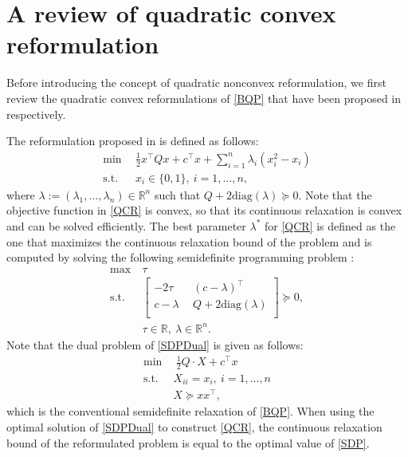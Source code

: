 \documentclass[pdflatex,sn-mathphys-num]{sn-jnl}%
\theoremstyle{thmstyleone}%
\theoremstyle{thmstyletwo}%
\theoremstyle{thmstylethree}%
\begin{document}
\section{A review of quadratic convex reformulation}\label{sec2}

Before introducing the concept of quadratic nonconvex reformulation, we first review the quadratic convex reformulations of \eqref{BQP} that have been proposed in \cite{Billionnet2007,Billionnet2012,Billionnet2013} respectively. %

The reformulation proposed in \cite{Billionnet2007} is defined as follows:
\begin{equation}\label{QCR}\tag{QCR}
	\begin{aligned}
		\min ~&~ \frac{1}{2}x^\top Q x+ c^\top x+\sum_{i=1}^n\lambda_i (x_i^2-x_i) \\
		\text{s.t.} ~&~ x_i \in \{0,1\},~i=1,\ldots,n,
	\end{aligned}
\end{equation}
where $\lambda:=(\lambda_1,\ldots,\lambda_n)\in\mathbb{R}^n$ such that $Q+2\textrm{diag}(\lambda)\succeq 0$. Note that the objective function in \eqref{QCR} is convex, so that its continuous relaxation is convex and can be solved efficiently. The best parameter $\lambda^\ast$ for \eqref{QCR} is defined as the one that maximizes the continuous relaxation bound of the problem and is computed by solving the following semidefinite programming problem  \cite{Billionnet2007}:
\begin{equation}\label{SDPDual}
	\begin{aligned}
		\max ~&\tau\\
		\mbox{s.t.} ~&\begin{bmatrix}
			-2 \tau ~&~ (c -\lambda)^\top \\
			c -\lambda  ~&~ Q+2\textrm{diag}(\lambda)  \\
		\end{bmatrix}\succeq 0,\\
		~&\tau\in\mathbb{R},~ \lambda\in\mathbb{R}^n.
	\end{aligned}
\end{equation}
Note that the dual problem of \eqref{SDPDual} is given as follows:
\begin{equation}\label{SDP}\tag{SDP}
	\begin{aligned}
		\min ~&~ \frac{1}{2}Q\cdot X+c^\top x\\
		\mbox{s.t.} ~&X_{ii}=x_i,~i=1,\ldots,n\\
		&X\succeq xx^\top,
	\end{aligned}
\end{equation}
which is the conventional semidefinite relaxation of \eqref{BQP}. When using the optimal solution of \eqref{SDPDual} to construct \eqref{QCR}, the continuous relaxation bound of the reformulated problem is equal to the optimal value of \eqref{SDP}.
\end{document}

